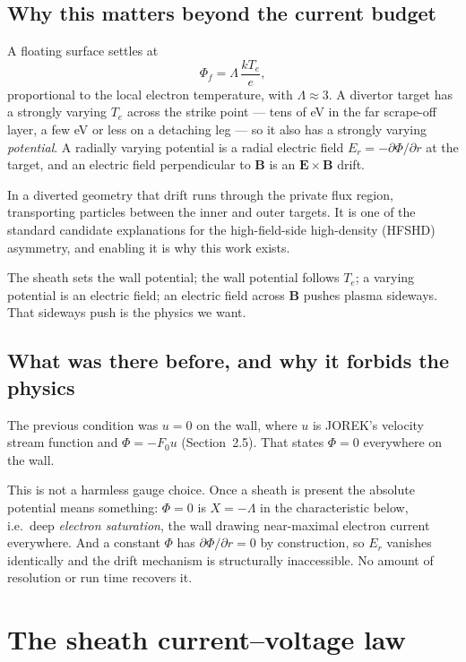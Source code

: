 \documentclass[11pt,a4paper]{article}
\begin{document}
\subsection{Why this matters beyond the current budget}

A floating surface settles at
\begin{equation}
  \Phi_f = \Lambda\,\frac{kT_e}{e},
\end{equation}
proportional to the local electron temperature, with $\Lambda\approx3$. A divertor target has a
strongly varying $T_e$ across the strike point --- tens of eV in the far scrape-off layer, a few eV
or less on a detaching leg --- so it also has a strongly varying \emph{potential}. A radially varying
potential is a radial electric field $E_r=-\partial\Phi/\partial r$ at the target, and an electric
field perpendicular to $\bm{B}$ is an $\bm{E}\times\bm{B}$ drift.

In a diverted geometry that drift runs through the private flux region, transporting particles
between the inner and outer targets. It is one of the standard candidate explanations for the
high-field-side high-density (HFSHD) asymmetry, and enabling it is why this work exists.

\begin{plain}
The sheath sets the wall potential; the wall potential follows $T_e$; a varying potential is an
electric field; an electric field across $\bm{B}$ pushes plasma sideways. That sideways push is the
physics we want.
\end{plain}

\subsection{What was there before, and why it forbids the physics}

The previous condition was $u=0$ on the wall, where $u$ is JOREK's velocity stream function and
$\Phi=-F_0u$ (Section~2.5). That states $\Phi=0$ everywhere on the wall.

This is not a harmless gauge choice. Once a sheath is present the absolute potential means something:
$\Phi=0$ is $X=-\Lambda$ in the characteristic below, i.e.\ deep \emph{electron saturation}, the wall
drawing near-maximal electron current everywhere. And a constant $\Phi$ has $\partial\Phi/\partial r=0$
by construction, so $E_r$ vanishes identically and the drift mechanism is structurally inaccessible.
No amount of resolution or run time recovers it.

\section{The sheath current--voltage law}
\end{document}
